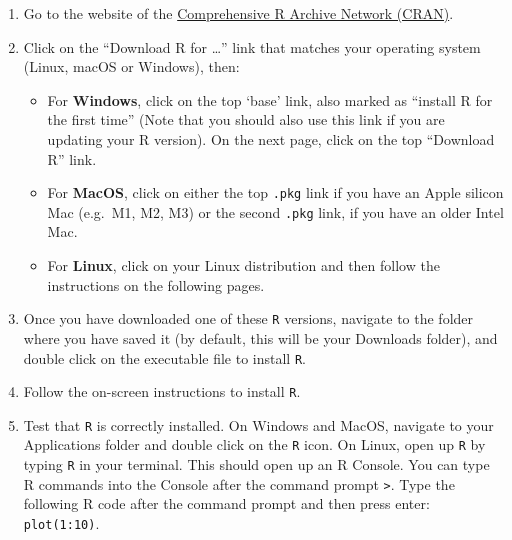 \documentclass[
  letterpaper,
  DIV=11,
  numbers=noendperiod]{scrreprt}
\providecommand{\tightlist}{%
  \setlength{\itemsep}{0pt}\setlength{\parskip}{0pt}}
\begin{document}
\begin{enumerate}
\def\labelenumi{\arabic{enumi}.}
\item
  Go to the website of the
  \href{https://cran.r-project.org}{Comprehensive R Archive Network
  (CRAN)}.
\item
  Click on the ``Download R for \ldots{}'' link that matches your
  operating system (Linux, macOS or Windows), then:

  \begin{itemize}
  \tightlist
  \item
    For \textbf{Windows}, click on the top `base' link, also marked as
    ``install R for the first time'' (Note that you should also use this
    link if you are updating your R version). On the next page, click on
    the top ``Download R'' link.
  \item
    For \textbf{MacOS}, click on either the top \texttt{.pkg} link if
    you have an Apple silicon Mac (e.g.~M1, M2, M3) or the second
    \texttt{.pkg} link, if you have an older Intel Mac.
  \item
    For \textbf{Linux}, click on your Linux distribution and then follow
    the instructions on the following pages.
  \end{itemize}
\item
  Once you have downloaded one of these \texttt{R} versions, navigate to
  the folder where you have saved it (by default, this will be your
  Downloads folder), and double click on the executable file to install
  \texttt{R}.
\item
  Follow the on-screen instructions to install \texttt{R}.
\item
  Test that \texttt{R} is correctly installed. On Windows and MacOS,
  navigate to your Applications folder and double click on the
  \texttt{R} icon. On Linux, open up \texttt{R} by typing \texttt{R} in
  your terminal. This should open up an R Console. You can type R
  commands into the Console after the command prompt
  \texttt{\textgreater{}}. Type the following R code after the command
  prompt and then press enter: \texttt{plot(1:10)}.
\end{enumerate}
\end{document}
